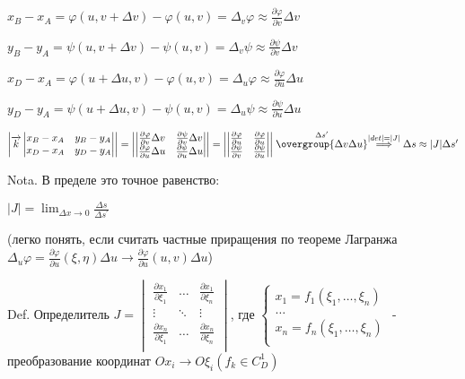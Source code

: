 \documentclass[12pt]{article}
\begin{document}
    $x_B - x_A = \varphi(u, v + \Delta v) - \varphi(u, v) = \Delta_v \varphi \approx \frac{\partial \varphi}{\partial v}\Delta v$

    $y_B - y_A = \psi(u, v + \Delta v) - \psi(u, v) = \Delta_v \psi \approx \frac{\partial \psi}{\partial v}\Delta v$

    $x_D - x_A = \varphi(u + \Delta u, v) - \varphi(u, v) = \Delta_u \varphi \approx \frac{\partial \varphi}{\partial u}\Delta u$

    $y_D - y_A = \psi(u + \Delta u, v) - \psi(u, v) = \Delta_u \psi \approx \frac{\partial \psi}{\partial u}\Delta u$

    $\left| \overrightarrow{k}
    \begin{vmatrix}
        x_B - x_A & y_B - y_A \\
        x_D - x_A & y_D - y_A
    \end{vmatrix}\right| = \left|
    \begin{vmatrix}
        \frac{\partial \varphi}{\partial v}\Delta v & \frac{\partial \psi}{\partial v}\Delta v \\
        \frac{\partial \varphi}{\partial u}\Delta u & \frac{\partial \psi}{\partial u}\Delta u
    \end{vmatrix}\right| = \left|
    \begin{vmatrix}
        \frac{\partial \varphi}{\partial u} & \frac{\partial \varphi}{\partial u} \\
        \frac{\partial \psi}{\partial v}    & \frac{\partial \psi}{\partial u}
    \end{vmatrix}\right| \stackrel{\Delta s^\prime}{\overgroup{\Delta v \Delta u}} \stackrel{|det| = |J|}{\Longrightarrow} \Delta s \approx |J|\Delta s^\prime$

    Nota. В пределе это точное равенство:

    $|J| = \lim_{\Delta x \to 0} \frac{\Delta s}{\Delta s^\prime}$

    (легко понять, если считать частные приращения по теореме Лагранжа $\Delta_u \varphi = \frac{\partial \varphi}{\partial u}(\xi, \eta) \Delta u \rightarrow \frac{\partial \varphi}{\partial u}(u, v) \Delta u$)

    Def. Определитель $J = \begin{vmatrix}
                               \frac{\partial x_1}{\partial \xi_1} & \dots  & \frac{\partial x_1}{\partial \xi_n} \\
                               \vdots                              & \ddots & \vdots                              \\
                               \frac{\partial x_n}{\partial \xi_1} & \dots  & \frac{\partial x_n}{\partial \xi_n} \\
    \end{vmatrix}$, где $\begin{cases}
                             x_1 = f_1(\xi_1, \dots, \xi_n) \\
                             \dots \\
                             x_n = f_n(\xi_1, \dots, \xi_n) \\
    \end{cases}$ - преобразование координат $Ox_i \to O\xi_i (f_k \in C^1_D)$
\end{document}
